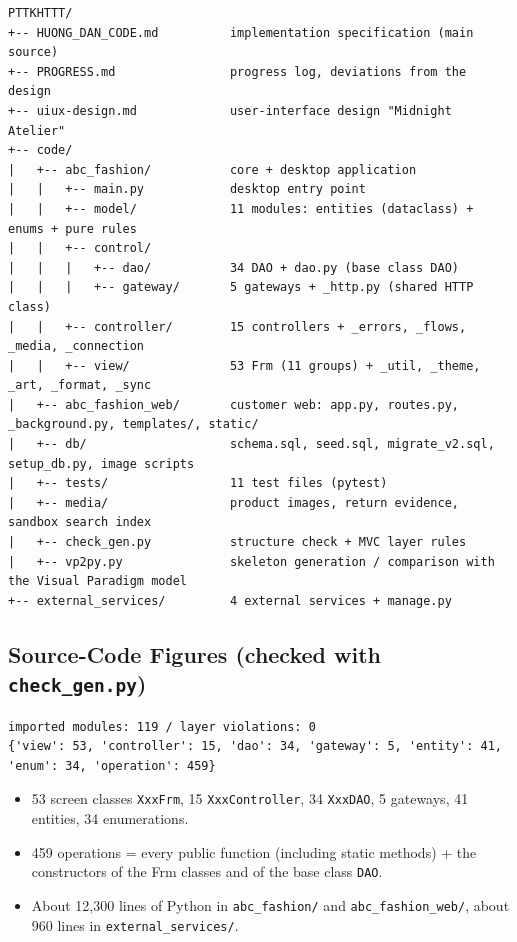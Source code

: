 \begin{lstlisting}[numbers=none]
PTTKHTTT/
+-- HUONG_DAN_CODE.md          implementation specification (main source)
+-- PROGRESS.md                progress log, deviations from the design
+-- uiux-design.md             user-interface design "Midnight Atelier"
+-- code/
|   +-- abc_fashion/           core + desktop application
|   |   +-- main.py            desktop entry point
|   |   +-- model/             11 modules: entities (dataclass) + enums + pure rules
|   |   +-- control/
|   |   |   +-- dao/           34 DAO + dao.py (base class DAO)
|   |   |   +-- gateway/       5 gateways + _http.py (shared HTTP class)
|   |   +-- controller/        15 controllers + _errors, _flows, _media, _connection
|   |   +-- view/              53 Frm (11 groups) + _util, _theme, _art, _format, _sync
|   +-- abc_fashion_web/       customer web: app.py, routes.py, _background.py, templates/, static/
|   +-- db/                    schema.sql, seed.sql, migrate_v2.sql, setup_db.py, image scripts
|   +-- tests/                 11 test files (pytest)
|   +-- media/                 product images, return evidence, sandbox search index
|   +-- check_gen.py           structure check + MVC layer rules
|   +-- vp2py.py               skeleton generation / comparison with the Visual Paradigm model
+-- external_services/         4 external services + manage.py
\end{lstlisting}

\hypertarget{source-code-figures-checked-with-check_gen.py}{%
\subsection{\texorpdfstring{Source-Code Figures (checked with
\texttt{check\_\allowbreak{}gen.\allowbreak{}py})}{Source-Code Figures (checked with check\_gen.py)}}\label{source-code-figures-checked-with-check_gen.py}}

\begin{lstlisting}[numbers=none]
imported modules: 119 / layer violations: 0
{'view': 53, 'controller': 15, 'dao': 34, 'gateway': 5, 'entity': 41, 'enum': 34, 'operation': 459}
\end{lstlisting}

\begin{itemize}
\tightlist
\item
  53 screen classes \texttt{XxxFrm}, 15 \texttt{XxxController}, 34
  \texttt{XxxDAO}, 5 gateways, 41 entities, 34 enumerations.
\item
  459 operations = every public function (including static methods) +
  the constructors of the Frm classes and of the base class
  \texttt{DAO}.
\item
  About 12,300 lines of Python in \texttt{abc\_\allowbreak{}fashion/\allowbreak{}} and
  \texttt{abc\_\allowbreak{}fashion\_\allowbreak{}web/\allowbreak{}}, about 960 lines in
  \texttt{external\_\allowbreak{}services/\allowbreak{}}.
\end{itemize}

